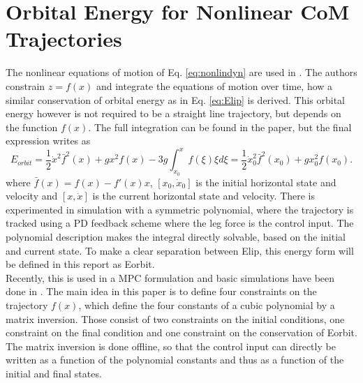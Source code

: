 \section{Orbital Energy for Nonlinear \ac{CoM} Trajectories}
The nonlinear equations of motion of Eq. \eqref{eq:nonlindyn} are used in \cite{pratt2007derivation}. The authors constrain $z=f(x)$ and integrate the equations of motion over time, how a similar conservation of orbital energy as in Eq. \eqref{eq:Elip} is derived. This orbital energy however is not required to be a straight line trajectory, but depends on the function $f(x)$. The  full integration can be found in the paper, but the final expression writes as
\begin{equation}
   E_{orbit} = \frac{1}{2}\dot{x}^2\bar{f}^2(x)+gx^2f(x) - 3g\int_{x_0}^xf(\xi)\xi d\xi = \frac{1}{2}\dot{x}_0^2\bar{f}^2(x_0)+gx_0^2f(x_0).
\end{equation}
where $\bar{f}(x)=f(x)-f'(x)x$, $[x_0,\dot{x}_0]$ is the initial horizontal state and velocity and $[x,\dot{x}]$ is the current horizontal state and velocity. There is experimented in simulation with a symmetric polynomial, where the trajectory is tracked using a PD feedback scheme where the leg force is the control input. The polynomial description makes the integral directly solvable, based on the initial and current state. To make a clear separation between \ac{Elip}, this energy form will be defined in this report as \ac{Eorbit}.\\
Recently, this is used in a \ac{MPC} formulation and basic simulations have been done in \cite{koolen2016balance}. The main idea in this paper is to define four constraints on the trajectory $f(x)$, which define the four constants of a cubic polynomial by a matrix inversion. Those consist of two constraints on the initial conditions, one constraint on the final condition and one constraint on the conservation of \ac{Eorbit}. The matrix inversion is done offline, so that the control input can directly be written as a function of the polynomial constants and thus as a function of the initial and final states. 

